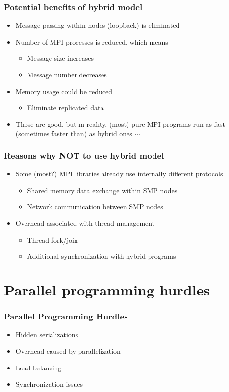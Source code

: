 \documentclass[10pt,t]{beamer}
\begin{document}
\begin{frame}
  \frametitle{Potential benefits of hybrid model}
  \begin{itemize}
  \item Message-passing within nodes (loopback) is eliminated
  \item Number of MPI processes is reduced, which means
    \begin{itemize}
    \item Message size increases
    \item Message number decreases
    \end{itemize}
  \item Memory usage could be reduced
    \begin{itemize}
    \item Eliminate replicated data
    \end{itemize}
  \item Those are good, but in reality, (most) pure MPI programs run as fast (sometimes faster than) as hybrid
    ones $\cdots$
  \end{itemize}
\end{frame}

\begin{frame}
  \frametitle{Reasons why NOT to use hybrid model}
  \begin{itemize}
  \item Some (most?) MPI libraries already use internally different protocols
    \begin{itemize}
    \item Shared memory data exchange within SMP nodes
    \item Network communication between SMP nodes
    \end{itemize}
  \item Overhead associated with thread management
    \begin{itemize}
    \item Thread fork/join
    \item Additional synchronization with hybrid programs 
    \end{itemize}
  \end{itemize}
\end{frame}

\section{Parallel programming hurdles}
\begin{frame}
  \frametitle{Parallel Programming Hurdles}
  \begin{itemize}
  \item Hidden serializations
  \item Overhead caused by parallelization
  \item Load balancing
  \item Synchronization issues
  \end{itemize}
\end{frame}
\end{document}
